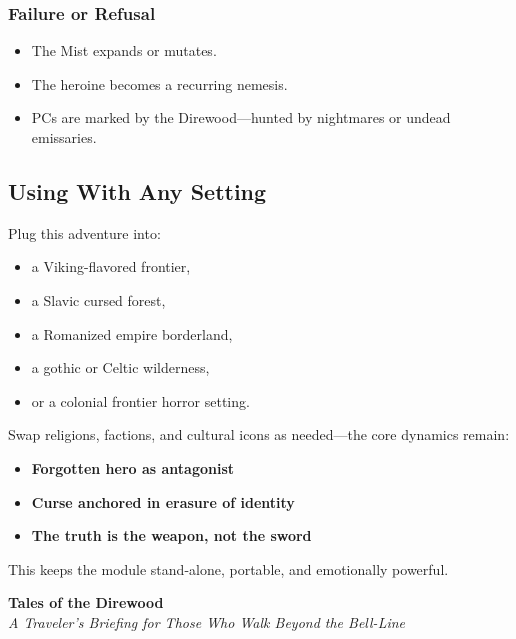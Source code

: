 \documentclass[11pt]{article}
\begin{document}
\subsubsection*{Failure or Refusal}

\begin{itemize}
  \item The Mist expands or mutates.
  \item The heroine becomes a recurring nemesis.
  \item PCs are marked by the Direwood---hunted by nightmares or undead emissaries.
\end{itemize}

\subsection{Using With Any Setting}

Plug this adventure into:

\begin{itemize}
  \item a Viking-flavored frontier,
  \item a Slavic cursed forest,
  \item a Romanized empire borderland,
  \item a gothic or Celtic wilderness,
  \item or a colonial frontier horror setting.
\end{itemize}

Swap religions, factions, and cultural icons as needed---the core dynamics remain:

\begin{itemize}
  \item \textbf{Forgotten hero as antagonist}
  \item \textbf{Curse anchored in erasure of identity}
  \item \textbf{The truth is the weapon, not the sword}
\end{itemize}

This keeps the module stand-alone, portable, and emotionally powerful.

\begin{center}
    {\Large\bfseries Tales of the Direwood}\\[4pt]
    \textit{A Traveler's Briefing for Those Who Walk Beyond the Bell-Line}
    \end{center}
    
    \vspace{0.5em}
    
\end{document}
